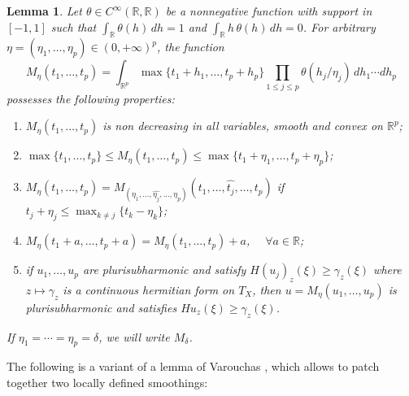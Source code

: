 \documentclass{article}
\newtheorem{lemma}[theorem]{Lemma}
\theoremstyle{definition}
\begin{document}
 
\begin{lemma}\cite[Lemma 5.18]{demailly1997complex} \label{lm: reg-max}
Let $\theta \in C^\infty(\mathbb{R},\mathbb{R})$ be a nonnegative function with support in $[-1,1]$ such that
$\int_{\mathbb{R}} \theta(h)\,dh = 1$ and $\int_{\mathbb{R}} h\,\theta(h)\,dh = 0$.
For arbitrary $\eta = (\eta_1,\ldots,\eta_p) \in (0,+\infty)^p$, the function
\begin{equation}
M_\eta(t_1,\ldots,t_p)
=
\int_{\mathbb{R}^p}
\max\{t_1 + h_1,\ldots,t_p + h_p\}
\prod_{1 \le j \le p} \theta(h_j/\eta_j)
\, dh_1 \cdots dh_p
\end{equation}
possesses the following properties:
\begin{enumerate}
\item $M_\eta(t_1,\ldots,t_p)$ is non decreasing in all variables, smooth and convex on $\mathbb{R}^p$;

\item $\max\{t_1,\ldots,t_p\} \le M_\eta(t_1,\ldots,t_p)
\le \max\{t_1+\eta_1,\ldots,t_p+\eta_p\}$;

\item $M_\eta(t_1,\ldots,t_p)
= M_{(\eta_1,\ldots,\widehat{\eta_j},\ldots,\eta_p)}
(t_1,\ldots,\widehat{t_j},\ldots,t_p)$
if $t_j+\eta_j \le \max_{k\ne j}\{t_k-\eta_k\}$;

\item $M_\eta(t_1+a,\ldots,t_p+a)=M_\eta(t_1,\ldots,t_p)+a$,
$\quad \forall a\in\mathbb{R}$;

\item if $u_1,\ldots,u_p$ are plurisubharmonic and satisfy
$H(u_j)_z(\xi)\ge\gamma_z(\xi)$ where $z\mapsto\gamma_z$
is a continuous hermitian form on $T_X$, then
$u=M_\eta(u_1,\ldots,u_p)$ is plurisubharmonic and satisfies
$H u_z(\xi)\ge\gamma_z(\xi)$.
\end{enumerate}
If $\eta_1=\cdots=\eta_p=\delta$, we will write $M_\delta$.
\end{lemma}


The following is a variant of a lemma of Varouchas \cite{varouchas1984stabilite}, which allows to patch together two locally defined smoothings:
\end{document}
